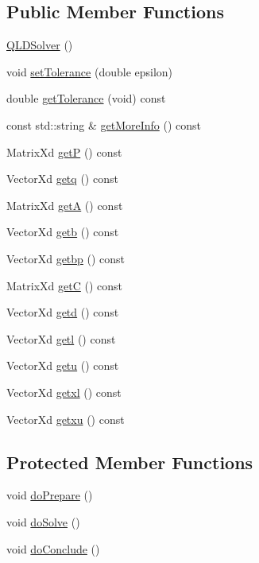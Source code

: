 \subsection*{Public Member Functions}
\begin{DoxyCompactItemize}
\item 
\hyperlink{classocra_1_1QLDSolver_a0071bb356541ccce1b5c5d3672baf72f}{Q\+L\+D\+Solver} ()
\item 
void \hyperlink{classocra_1_1QLDSolver_ad14fc2be094603279ccf271e48e5dbe7}{set\+Tolerance} (double epsilon)
\item 
double \hyperlink{classocra_1_1QLDSolver_a491581b625f562d7c5bd8b939a9bafe9}{get\+Tolerance} (void) const
\item 
const std\+::string \& \hyperlink{classocra_1_1QLDSolver_a387f7b02e2cac27c91a0e36c2b473722}{get\+More\+Info} () const
\item 
Matrix\+Xd \hyperlink{classocra_1_1QLDSolver_a1c710dd84d8e2ff4f87e3e20a9b656ee}{getP} () const
\item 
Vector\+Xd \hyperlink{classocra_1_1QLDSolver_ae824b54386917fbd98c2fa4a3242e06a}{getq} () const
\item 
Matrix\+Xd \hyperlink{classocra_1_1QLDSolver_a267add4e76edafa27e41574e14a5b17f}{getA} () const
\item 
Vector\+Xd \hyperlink{classocra_1_1QLDSolver_af206f7c0caa5a02c505d613bf3888eea}{getb} () const
\item 
Vector\+Xd \hyperlink{classocra_1_1QLDSolver_abefe0e7142a6d9d5094d8ae6816cce91}{getbp} () const
\item 
Matrix\+Xd \hyperlink{classocra_1_1QLDSolver_a92a18dc5df3511bcc9fc9ff5f45f621b}{getC} () const
\item 
Vector\+Xd \hyperlink{classocra_1_1QLDSolver_ad3434ad289da51ffe440b7959972ca89}{getd} () const
\item 
Vector\+Xd \hyperlink{classocra_1_1QLDSolver_aa79266a95a76ec3e3c7bd6d92af1cbcb}{getl} () const
\item 
Vector\+Xd \hyperlink{classocra_1_1QLDSolver_a643f978628ee45f88940ddbd7822aedd}{getu} () const
\item 
Vector\+Xd \hyperlink{classocra_1_1QLDSolver_ab0ad9b36f9a063b0fb59d48e447a1449}{getxl} () const
\item 
Vector\+Xd \hyperlink{classocra_1_1QLDSolver_a59bf1fba85f791bc1c30521373fcb999}{getxu} () const
\end{DoxyCompactItemize}
\subsection*{Protected Member Functions}
\begin{DoxyCompactItemize}
\item 
void \hyperlink{classocra_1_1QLDSolver_ac590e2b4c851042177e8e4b84f946ced}{do\+Prepare} ()
\item 
void \hyperlink{classocra_1_1QLDSolver_acf5bca219fc8a5be246589f76097a6e0}{do\+Solve} ()
\item 
void \hyperlink{classocra_1_1QLDSolver_a1d6f5101e1cc2b6bc8256ac2d3e0d710}{do\+Conclude} ()
\end{DoxyCompactItemize}
